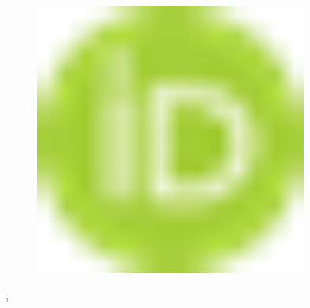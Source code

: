\begin{figure}[H]
	\centering
	\includegraphics[width=0.8\textwidth]{media/chem2/image1}
	\caption*{}
\end{figure}
,

